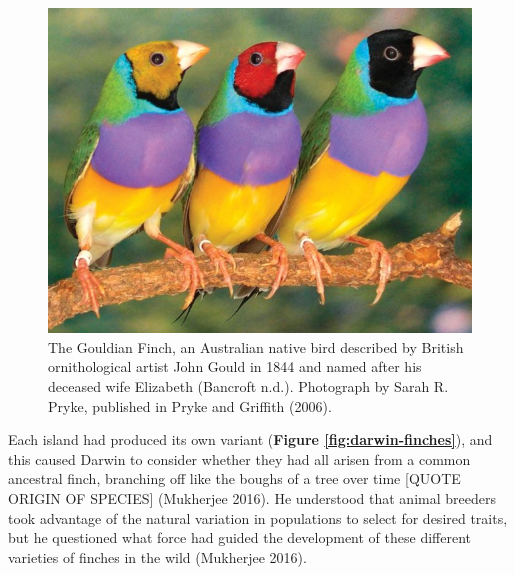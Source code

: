 \documentclass[
]{book}
\begin{document}
\begin{figure}

\hfill{}\includegraphics[width=1\linewidth]{figs/introduction/gouldian_finch} 

\caption{The Gouldian Finch, an Australian native bird described by British ornithological artist John Gould in 1844 and named after his deceased wife Elizabeth (Bancroft n.d.). Photograph by Sarah R. Pryke, published in Pryke and Griffith (2006).}\label{fig:gouldian-finch}
\end{figure}

Each island had produced its own variant (\textbf{Figure \ref{fig:darwin-finches}}), and this caused Darwin to consider whether they had all arisen from a common ancestral finch, branching off like the boughs of a tree over time {[}QUOTE ORIGIN OF SPECIES{]} (Mukherjee 2016). He understood that animal breeders took advantage of the natural variation in populations to select for desired traits, but he questioned what force had guided the development of these different varieties of finches in the wild (Mukherjee 2016).
\end{document}

